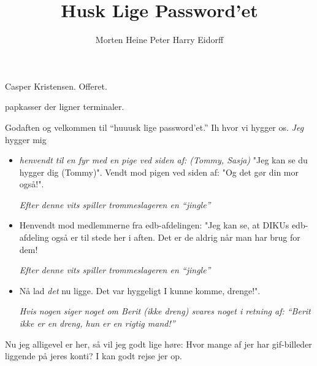 \documentclass[10pt]{article}
\title{Husk Lige Password'et}
\author{Morten Heine  Peter Harry Eidorff}
\begin{document}
\maketitle

\begin{sketch}

\begin{roles}
   Casper Kristensen.
   Offeret.
\end{roles}

\begin{props}
   papkasser der ligner terminaler.
   ~
\end{props}



 Godaften og velkommen til ``huuusk lige password'et.''
Ih hvor vi hygger os. {\em Jeg} hygger mig
\begin{itemize}
\item {\em henvendt til en fyr med en pige ved siden af: (Tommy, Sasja)}
  "Jeg kan se du hygger dig (Tommy)".  Vendt mod pigen ved siden af: 
 "Og det gør din mor også!".
 
{\em Efter denne vits spiller trommeslageren en ``jingle''}

\item Henvendt mod medlemmerne fra edb-afdelingen: "Jeg kan se, at DIKUs
  edb-afdeling også er til stede her i aften. Det er de aldrig når man har 
  brug for dem! 

{\em Efter denne vits spiller trommeslageren en ``jingle''}

\item Nå lad {\em det} nu ligge. Det var hyggeligt I kunne komme, 
  drenge!".

{\em Hvis nogen siger noget om Berit (ikke dreng) svares noget i
retning af: ``Berit ikke er en dreng, hun er en rigtig mand!''}

\end{itemize}
  
 Nu jeg alligevel er her, så vil jeg godt lige høre: 
Hvor mange af jer har gif-billeder liggende på jeres konti? I kan 
godt rejse jer op.


\end{sketch}
\end{document}
